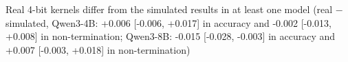 Real 4-bit kernels differ from the simulated results in at least one model (real $-$ simulated, Qwen3-4B: +0.006 [-0.006, +0.017] in accuracy and -0.002 [-0.013, +0.008] in non-termination; Qwen3-8B: -0.015 [-0.028, -0.003] in accuracy and +0.007 [-0.003, +0.018] in non-termination)%
